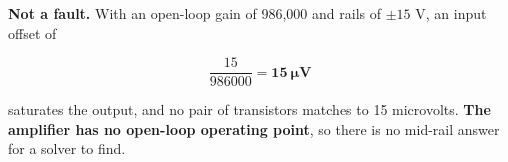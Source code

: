
\textbf{Not a fault.} With an open-loop gain of 986,000 and rails of $\pm 15$ V, an input offset of

\[
  \frac{15}{986000} = \mathbf{15\ \mu\text{V}}
\]

saturates the output, and no pair of transistors matches to 15 microvolts. \textbf{The amplifier has no open-loop operating point}, so there is no mid-rail answer for a solver to find.
